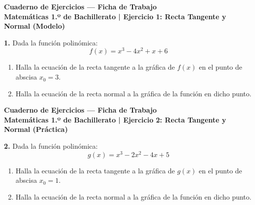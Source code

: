 ﻿\documentclass[11pt,a4paper]{article}
\begin{document}
\pagestyle{empty}

\begin{center}
    {\LARGE \textbf{Cuaderno de Ejercicios — Ficha de Trabajo}}\\[4pt]
    {\large \textbf{Matemáticas 1.º de Bachillerato | Ejercicio 1: Recta Tangente y Normal (Modelo)}}
\end{center}

\vspace{0.8cm}
\noindent\textbf{1.} Dada la función polinómica:
\[
f(x) = x^3 - 4x^2 + x + 6
\]

\begin{enumerate}[label=\textbf{\alph*)}, leftmargin=2em, itemsep=12pt]
    \item Halla la ecuación de la recta tangente a la gráfica de $f(x)$ en el punto de abscisa $x_0 = 3$.
    \item Halla la ecuación de la recta normal a la gráfica de la función en dicho punto.
\end{enumerate}

\newpage

\begin{center}
    {\LARGE \textbf{Cuaderno de Ejercicios — Ficha de Trabajo}}\\[4pt]
    {\large \textbf{Matemáticas 1.º de Bachillerato | Ejercicio 2: Recta Tangente y Normal (Práctica)}}
\end{center}

\vspace{0.8cm}
\noindent\textbf{2.} Dada la función polinómica:
\[
g(x) = x^3 - 2x^2 - 4x + 5
\]

\begin{enumerate}[label=\textbf{\alph*)}, leftmargin=2em, itemsep=12pt]
    \item Halla la ecuación de la recta tangente a la gráfica de $g(x)$ en el punto de abscisa $x_0 = 1$.
    \item Halla la ecuación de la recta normal a la gráfica de la función en dicho punto.
\end{enumerate}

\newpage
\end{document}
